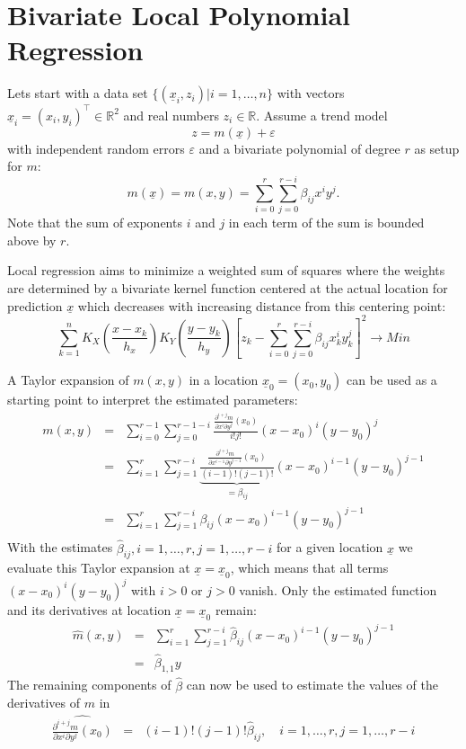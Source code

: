 \documentclass[nojss]{jss}
\newcommand{\R}{\mathbb{R}}
\newcommand{\Vect}[1]{\underline{#1}}
\begin{document}
\section{Bivariate Local Polynomial Regression}
\label{sec:local-polyn-regr}
Lets start with a data set $\{(\Vect{x}_{i},z_{i})|i=1,\ldots,n\}$
with vectors $\Vect{x}_{i}=(x_{i},y_{i})^{\top}\in\R^{2}$ and real
numbers $z_{i}\in\R$. Assume a trend model
$$
z=m(\Vect{x})+\varepsilon
$$
with independent random errors $\varepsilon$
and a bivariate polynomial of degree $r$ as setup for $m$:
$$
m(\Vect{x})=m(x,y)=\sum_{i=0}^{r}\sum_{j=0}^{r-i}\beta_{ij}x^{i}y^{j}.
$$
Note that the sum of exponents $i$ and $j$ in each term of the sum is
bounded above by $r$.

Local regression aims to minimize a weighted sum of squares where the
weights are determined by a bivariate kernel function centered at the
actual location for prediction $\Vect{x}$ which decreases with increasing
distance from this centering point:
$$
\sum_{k=1}^{n}K_{X}\left(\frac{x-x_k}{h_{x}}\right)K_{Y}\left(\frac{y-y_k}{h_{y}}\right)
\left[z_k-\sum_{i=0}^{r}\sum_{j=0}^{r-i}\beta_{ij}x_k^{i}y_k^{j}\right]^2 \rightarrow Min
$$

A Taylor expansion of $m(x,y)$ in a location
$\Vect{x}_{0}=(x_{0},y_{0})$ can be used as a starting point to
interpret the estimated parameters:
\begin{eqnarray*}
  m(x,y) &=& \sum_{i=0}^{r-1}\sum_{j=0}^{r-1-i}  \frac{\frac{\partial^{i+j} m}{\partial x^{i}\partial y^{j}}(x_0)}{i!j!}(x-x_0)^{i}(y-y_0)^{j}\\
  &=& \sum_{i=1}^{r}\sum_{j=1}^{r-i} \underbrace{\frac{\frac{\partial^{i+j} m}{\partial x^{i-1}\partial y^{j-1}}(x_0)}{(i-1)!(j-1)!}}_{=\beta_{ij}}(x-x_0)^{i-1}(y-y_0)^{j-1}\\
  &=& \sum_{i=1}^{r}\sum_{j=1}^{r-i} \beta_{ij} (x-x_0)^{i-1}(y-y_0)^{j-1}\\
\end{eqnarray*}
With the estimates
$\widehat{\beta}_{ij}, i=1,\ldots,r, j=1,\ldots,r-i$ for a given
location $\Vect{x}$ we evaluate this Taylor expansion at
$\Vect{x}=\Vect{x}_0$, which means that all terms
$(x-x_0)^{i}(y-y_0)^{j}$ with $i>0$ or $j>0$ vanish.  Only the
estimated function and its derivatives at location $\Vect{x}=\Vect{x}_0$ remain:
\begin{eqnarray}
  \label{eq:estderivs}
  \widehat{m}(x,y)&=&\sum_{i=1}^{r}\sum_{j=1}^{r-i}\widehat{\beta}_{ij} (x-x_0)^{i-1}(y-y_0)^{j-1}\\
  &=&\widehat{\beta}_{1,1}y
\end{eqnarray}
The remaining components of $\widehat{\beta}$ can  now be used to estimate
the values of the derivatives of $m$ in
\begin{eqnarray}
  \label{eq:estderiv}
  \widehat{\frac{\partial^{i+j} m}{\partial x^{i}\partial y^{j}}(x_0)}&=&(i-1)!(j-1)!\widehat{\beta}_{ij}, 
                                                              \quad i=1,\ldots,r, j=1,\ldots,r-i
\end{eqnarray}
\end{document}
